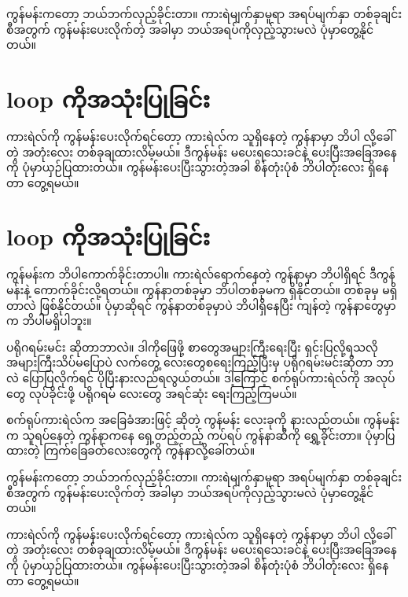 \begin{sloppypar}
 ကွန်မန်းကတော့ ဘယ်ဘက်လှည့်ခိုင်းတာ။ ကားရဲမျက်နှာမူရာ အရပ်မျက်နှာ တစ်ခုချင်းစီအတွက်  ကွန်မန်းပေးလိုက်တဲ့ အခါမှာ ဘယ်အရပ်ကိုလှည့်သွားမလဲ ပုံမှာတွေ့နိုင်တယ်။
\section{{} loop ကိုအသုံးပြုခြင်း}
ကားရဲလ်ကို  ကွန်မန်းပေးလိုက်ရင်တော့ ကားရဲလ်က သူရှိနေတဲ့ ကွန်နာမှာ ဘိပါ လို့ခေါ်တဲ့ အတုံးလေး တစ်ခုချထားလိမ့်မယ်။ ဒီကွန်မန်း မပေးရသေးခင်နဲ့ ပေးပြီးအခြေအနေကို ပုံမှာယှဉ်ပြထားတယ်။ ကွန်မန်းပေးပြီးသွားတဲ့အခါ စိန်တုံးပုံစံ ဘိပါတုံးလေး ရှိနေတာ တွေ့ရမယ်။ 
\section{{} loop ကိုအသုံးပြုခြင်း}

 ကွန်မန်းက ဘိပါကောက်ခိုင်းတာပါ။ ကားရဲလ်ရောက်နေတဲ့ ကွန်နာမှာ ဘိပါရှိရင် ဒီကွန်မန်းနဲ့ ကောက်ခိုင်းလို့ရတယ်။ ကွန်နာတစ်ခုမှာ ဘိပါတစ်ခုမက ရှိနိုင်တယ်။ တစ်ခုမှ မရှိတာလဲ ဖြစ်နိုင်တယ်။ ပုံမှာဆိုရင် ကွန်နာတစ်ခုမှာပဲ ဘိပါရှိနေပြီး ကျန်တဲ့ ကွန်နာတွေမှာက ဘိပါမရှိပါဘူး။

ပရိုဂရမ်းမင်း ဆိုတာဘာလဲ။ ဒါကိုဖြေဖို့ စာတွေအများကြီးရေးပြီး ရှင်းပြလို့ရသလို အများကြီးသိပ်မပြောပဲ လက်တွေ့  လေးတွေစရေးကြည့်ပြီးမှ ပရိုဂရမ်းမင်းဆိုတာ ဘာလဲ ပြောပြလိုက်ရင် ပိုပြီးနားလည်ရလွယ်တယ်။ ဒါ့ကြောင့် စက်ရုပ်ကားရဲလ်ကို အလုပ်တွေ လုပ်ခိုင်းဖို့ ပရိုဂရမ် လေးတွေ အရင်ဆုံး ရေးကြည့်ကြမယ်။

စက်ရုပ်ကားရဲလ်က အခြေခံအားဖြင့်  ဆိုတဲ့ ကွန်မန်း လေးခုကို နားလည်တယ်။  ကွန်မန်းက သူရပ်နေတဲ့ ကွန်နာကနေ ရှေ့တည့်တည့် ကပ်ရပ် ကွန်နာဆီကို ရွှေ့ခိုင်းတာ။ ပုံမှာပြထားတဲ့ ကြက်ခြေခတ်လေးတွေကို ကွန်နာလို့ခေါ်တယ်။ 

 ကွန်မန်းကတော့ ဘယ်ဘက်လှည့်ခိုင်းတာ။ ကားရဲမျက်နှာမူရာ အရပ်မျက်နှာ တစ်ခုချင်းစီအတွက်  ကွန်မန်းပေးလိုက်တဲ့ အခါမှာ ဘယ်အရပ်ကိုလှည့်သွားမလဲ ပုံမှာတွေ့နိုင်တယ်။

ကားရဲလ်ကို  ကွန်မန်းပေးလိုက်ရင်တော့ ကားရဲလ်က သူရှိနေတဲ့ ကွန်နာမှာ ဘိပါ လို့ခေါ်တဲ့ အတုံးလေး တစ်ခုချထားလိမ့်မယ်။ ဒီကွန်မန်း မပေးရသေးခင်နဲ့ ပေးပြီးအခြေအနေကို ပုံမှာယှဉ်ပြထားတယ်။ ကွန်မန်းပေးပြီးသွားတဲ့အခါ စိန်တုံးပုံစံ ဘိပါတုံးလေး ရှိနေတာ တွေ့ရမယ်။ 


\end{sloppypar}
